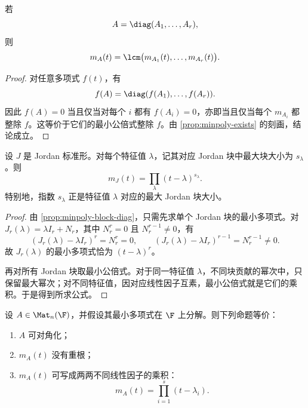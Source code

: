 \begin{proposition}\label{prop:minpoly-block-diag}
若
\[
A=\diag(A_1,\dots,A_r),
\]
则
\[
m_A(t)=\lcm\bigl(m_{A_1}(t),\dots,m_{A_r}(t)\bigr).
\]
\end{proposition}

\begin{proof}
对任意多项式 \(f(t)\)，有
\[
f(A)=\diag(f(A_1),\dots,f(A_r)).
\]
因此 \(f(A)=0\) 当且仅当对每个 \(i\) 都有 \(f(A_i)=0\)，亦即当且仅当每个 \(m_{A_i}\) 都整除 \(f\)。这等价于它们的最小公倍式整除 \(f\)。由 \cref{prop:minpoly-exists} 的刻画，结论成立。
\end{proof}

\begin{proposition}\label{prop:minpoly-jordan}
设 \(J\) 是 Jordan 标准形。对每个特征值 \(\lambda\)，记其对应 Jordan 块中最大块大小为 \(s_\lambda\)。则
\[
m_J(t)=\prod_{\lambda}(t-\lambda)^{s_\lambda}.
\]
特别地，指数 \(s_\lambda\) 正是特征值 \(\lambda\) 对应的最大 Jordan 块大小。
\end{proposition}

\begin{proof}
由 \cref{prop:minpoly-block-diag}，只需先求单个 Jordan 块的最小多项式。对 \(J_r(\lambda)=\lambda I_r+N_r\)，其中 \(N_r^r=0\) 且 \(N_r^{r-1}\neq 0\)，有
\[
(J_r(\lambda)-\lambda I_r)^r=N_r^r=0,
\qquad (J_r(\lambda)-\lambda I_r)^{r-1}=N_r^{r-1}\neq 0.
\]
故 \(J_r(\lambda)\) 的最小多项式恰为 \((t-\lambda)^r\)。

再对所有 Jordan 块取最小公倍式。对于同一特征值 \(\lambda\)，不同块贡献的幂次中，只保留最大幂次；对不同特征值，因对应线性因子互素，最小公倍式就是它们的乘积。于是得到所求公式。
\end{proof}

\begin{theorem}\label{thm:minpoly-diag-criterion}
设 \(A\in \Mat_n(\F)\)，并假设其最小多项式在 \(\F\) 上分解。则下列命题等价：
\begin{enumerate}[label=(\arabic*), leftmargin=2.4em]
  \item \(A\) 可对角化；
  \item \(m_A(t)\) 没有重根；
  \item \(m_A(t)\) 可写成两两不同线性因子的乘积：
  \[
  m_A(t)=\prod_{i=1}^s (t-\lambda_i).
  \]
\end{enumerate}
\end{theorem}

